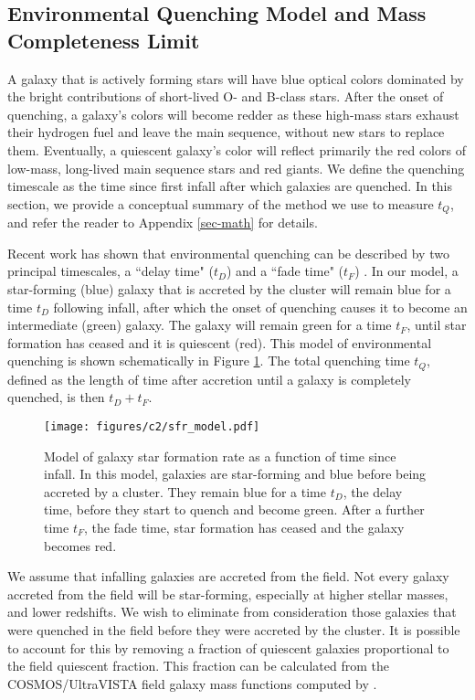 \subsection{Environmental Quenching Model and Mass Completeness Limit}\label{sec-model}

A galaxy that is actively forming stars will have blue optical colors dominated by the bright contributions of short-lived O- and B-class stars.
After the onset of quenching, a galaxy's colors will become redder as these high-mass stars exhaust their hydrogen fuel and leave the main sequence, without new stars to replace them.
Eventually, a quiescent galaxy's color will reflect primarily the red colors of low-mass, long-lived main sequence stars and red giants.
We define the quenching timescale as the time since first infall after which galaxies are quenched.
In this section, we provide a conceptual summary of the method we use to measure $t_Q$, and refer the reader to Appendix \ref{sec-math} for details.

Recent work has shown that environmental quenching can be described by two principal timescales, a ``delay time" ($t_D$) and a ``fade time" ($t_F$) \citep{Wetzel:2013aa, McGee:2014aa, Mok:2014aa, Haines:2015aa, Balogh:2016aa, Fossati:2017aa}.
In our model, a star-forming (blue) galaxy that is accreted by the cluster will remain blue for a time $t_D$ following infall, after which the onset of quenching causes it to become an intermediate (green) galaxy.
The galaxy will remain green for a time $t_F$, until star formation has ceased and it is quiescent (red).
This model of environmental quenching is shown schematically in Figure \ref{fig-sfr}.
The total quenching time $t_Q$, defined as the length of time after accretion until a galaxy is completely quenched, is then $t_D + t_F$.

\begin{figure}[h!]
\centering \texttt{[image: figures/c2/sfr\_model.pdf]}
\caption[Toy model of star formation history for a quenched galaxy]{Model of galaxy star formation rate as a function of time since infall. In this model, galaxies are star-forming and blue before being accreted by a cluster. They remain blue for a time $t_D$, the delay time, before they start to quench and become green. After a further time $t_F$, the fade time, star formation has ceased and the galaxy becomes red.
\label{fig-sfr}}
\end{figure}

We assume that infalling galaxies are accreted from the field.
Not every galaxy accreted from the field will be star-forming, especially at higher stellar masses, and lower redshifts.
We wish to eliminate from consideration those galaxies that were quenched in the field before they were accreted by the cluster.
It is possible to account for this by removing a fraction of quiescent galaxies proportional to the field quiescent fraction.
This fraction can be calculated from the COSMOS/UltraVISTA field galaxy mass functions computed by \citet{Muzzin:2013ab}.

